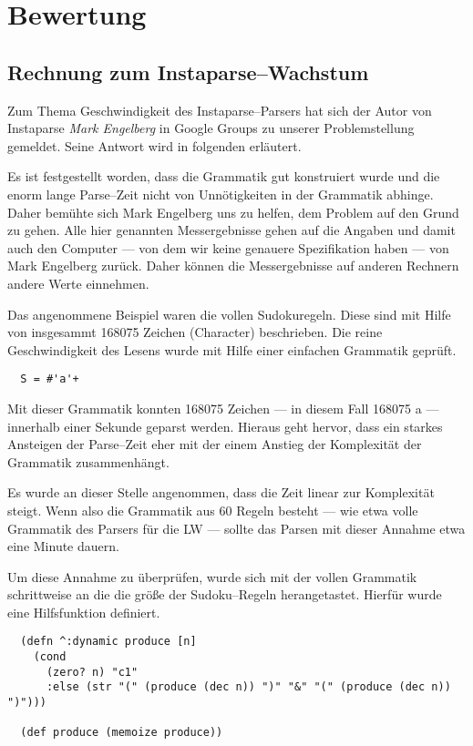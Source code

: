 \documentclass[ngerman,a4paper,abstracton,open=right,twoside=false,toc=listofnumbered,bibtotocnumbered]{scrreprt}
\begin{document}
\chapter{Bewertung}
\section{Rechnung zum Instaparse--Wachstum}

Zum Thema Geschwindigkeit des Instaparse--Parsers hat sich der Autor von Instaparse \emph{Mark Engelberg} in Google Groups zu unserer Problemstellung gemeldet. Seine Antwort wird in folgenden erläutert.

Es ist festgestellt worden, dass die Grammatik gut konstruiert wurde und die enorm lange Parse--Zeit nicht von Unnötigkeiten in der Grammatik abhinge. Daher bemühte sich Mark Engelberg uns zu helfen, dem Problem auf den Grund zu gehen. Alle hier genannten Messergebnisse gehen auf die Angaben und damit auch den Computer --- von dem wir keine genauere Spezifikation haben --- von Mark Engelberg zurück. Daher können die Messergebnisse auf anderen Rechnern andere Werte einnehmen.

Das angenommene Beispiel waren die vollen Sudokuregeln. Diese sind mit Hilfe von insgesammt 168075 Zeichen (Character) beschrieben. Die reine Geschwindigkeit des Lesens wurde mit Hilfe einer einfachen Grammatik geprüft.

\begin{lstlisting}
  S = #'a'+
\end{lstlisting}

Mit dieser Grammatik konnten 168075 Zeichen --- in diesem Fall 168075 \glqq{}a\grqq{} --- innerhalb einer Sekunde geparst werden. Hieraus geht hervor, dass ein starkes Ansteigen der Parse--Zeit eher mit der einem Anstieg der Komplexität der Grammatik zusammenhängt.

Es wurde an dieser Stelle angenommen, dass die Zeit linear zur Komplexität steigt. Wenn also die Grammatik aus 60 Regeln besteht --- wie etwa volle Grammatik des Parsers für die LW --- sollte das Parsen mit dieser Annahme etwa eine Minute dauern.

Um diese Annahme zu überprüfen, wurde sich mit der vollen Grammatik schrittweise an die die größe der Sudoku--Regeln herangetastet. Hierfür wurde eine Hilfsfunktion definiert.

\begin{lstlisting}
  (defn ^:dynamic produce [n]
    (cond
      (zero? n) "c1"
      :else (str "(" (produce (dec n)) ")" "&" "(" (produce (dec n)) ")")))

  (def produce (memoize produce))
\end{lstlisting}
\end{document}
